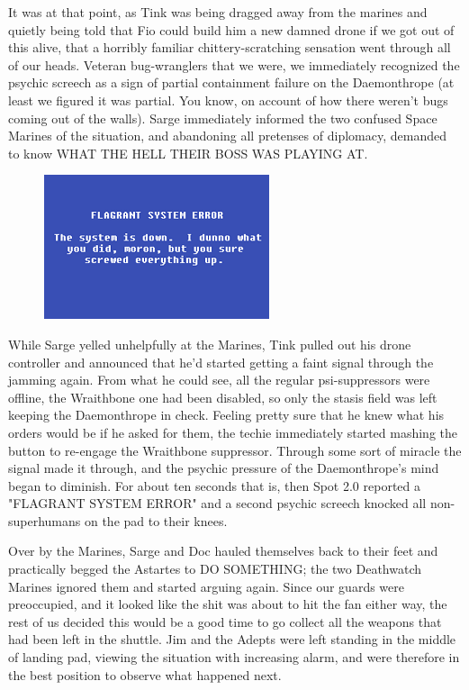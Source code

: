 It was at that point, as Tink was being dragged away from the marines and quietly being told that Fio could build him a new damned drone if we got out of this alive, that a horribly familiar chittery-scratching sensation went through all of our heads. 
Veteran bug-wranglers that we were, we immediately recognized the psychic screech as a sign of partial containment failure on the Daemonthrope (at least we figured it was partial. 
You know, on account of how there weren't bugs coming out of the walls). 
Sarge immediately informed the two confused Space Marines of the situation, and abandoning all pretenses of diplomacy, demanded to know WHAT THE HELL THEIR BOSS WAS PLAYING AT.
\begin{figure}
	\begin{center}
		\includegraphics[width=\figwidth]{pics/16/16.png}
	\end{center}
\end{figure}
While Sarge yelled unhelpfully at the Marines, Tink pulled out his drone controller and announced that he'd started getting a faint signal through the jamming again. 
From what he could see, all the regular psi-suppressors were offline, the Wraithbone one had been disabled, so only the stasis field was left keeping the Daemonthrope in check. 
Feeling pretty sure that he knew what his orders would be if he asked for them, the techie immediately started mashing the button to re-engage the Wraithbone suppressor. 
Through some sort of miracle the signal made it through, and the psychic pressure of the Daemonthrope's mind began to diminish. 
For about ten seconds that is, then Spot 2.0 reported a "FLAGRANT SYSTEM ERROR" and a second psychic screech knocked all non-superhumans on the pad to their knees.

Over by the Marines, Sarge and Doc hauled themselves back to their feet and practically begged the Astartes to DO SOMETHING; 
the two Deathwatch Marines ignored them and started arguing again. 
Since our guards were preoccupied, and it looked like the shit was about to hit the fan either way, the rest of us decided this would be a good time to go collect all the weapons that had been left in the shuttle. 
Jim and the Adepts were left standing in the middle of landing pad, viewing the situation with increasing alarm, and were therefore in the best position to observe what happened next.

